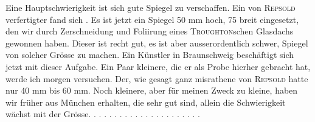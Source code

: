 Eine Hauptschwierigkeit ist sich gute Spiegel zu verschaffen. Ein von
\textsc{Repsold} verfertigter fand sich . Es ist jetzt ein Spiegel
50 mm hoch, 75 breit eingesetzt, den wir durch Zerschneidung und Foliirung
\clearpage{}
\noindent eines \textsc{Troughton}schen Glasdachs gewonnen haben. Dieser ist recht gut, es
ist aber ausserordentlich schwer,  Spiegel von solcher Grösse zu machen.
Ein Künstler in Braunschweig beschäftigt sich jetzt mit dieser Aufgabe. Ein
Paar kleinere, die er als Probe hierher gebracht hat, werde ich morgen versuchen.
Der, wie gesagt ganz misrathene von \textsc{Repsold} hatte nur 40 mm bis
60 mm. Noch kleinere, aber für meinen Zweck  zu kleine, haben wir
früher aus München erhalten, die sehr gut sind, allein die Schwierigkeit
wächst mit der Grösse. . . . . . . . . . . . . . . . . . . . . .
\clearpage\endgroup
